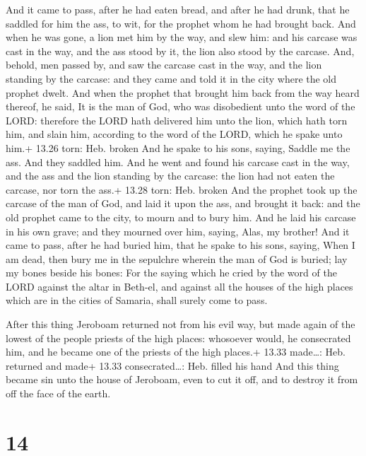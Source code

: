  And it came to pass, after he had eaten bread, and after
he had drunk, that he saddled for him the ass, to wit, for the prophet
whom he had brought back.  And when he was gone, a lion met
him by the way, and slew him: and his carcase was cast in the way, and
the ass stood by it, the lion also stood by the carcase. 
And, behold, men passed by, and saw the carcase cast in the way, and the
lion standing by the carcase: and they came and told it in the city
where the old prophet dwelt.  And when the prophet that
brought him back from the way heard thereof, he said, It is the man of
God, who was disobedient unto the word of the LORD: therefore the LORD
hath delivered him unto the lion, which hath torn him, and slain him,
according to the word of the LORD, which he spake unto him.+ 13.26 torn:
Heb. broken  And he spake to his sons, saying, Saddle me
the ass. And they saddled him.  And he went and found his
carcase cast in the way, and the ass and the lion standing by the
carcase: the lion had not eaten the carcase, nor torn the ass.+ 13.28
torn: Heb. broken  And the prophet took up the carcase of
the man of God, and laid it upon the ass, and brought it back: and the
old prophet came to the city, to mourn and to bury him. 
And he laid his carcase in his own grave; and they mourned over him,
saying, Alas, my brother!  And it came to pass, after he
had buried him, that he spake to his sons, saying, When I am dead, then
bury me in the sepulchre wherein the man of God is buried; lay my bones
beside his bones:  For the saying which he cried by the
word of the LORD against the altar in Beth-el, and against all the
houses of the high places which are in the cities of Samaria, shall
surely come to pass.

 After this thing Jeroboam returned not from his evil
way, but made again of the lowest of the people priests of the high
places: whosoever would, he consecrated him, and he became one of the
priests of the high places.+ 13.33 made\ldots: Heb. returned and made+
13.33 consecrated\ldots: Heb. filled his hand  And this
thing became sin unto the house of Jeroboam, even to cut it off, and to
destroy it from off the face of the earth.

\hypertarget{section-13}{%
\section{14}\label{section-13}}

